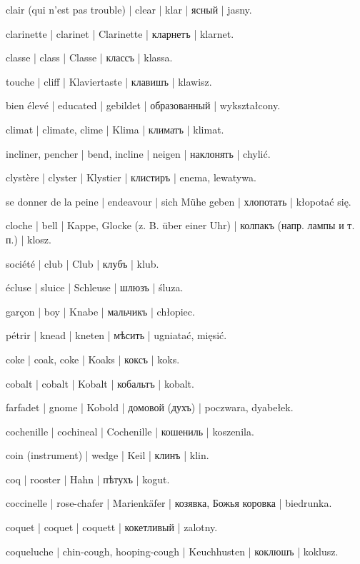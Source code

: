 \begin{outdent}{1em}
clair (qui n’est pas trouble) | clear | klar | ясный | jasny.

clarinette | clarinet | Clarinette | кларнетъ | klarnet.

classe | class | Classe | классъ | klassa.

touche | cliff | Klaviertaste | клавишъ | klawisz.

bien élevé | educated | gebildet | образованный | wykształcony.

climat | climate, clime | Klima | климатъ | klimat.

incliner, pencher | bend, incline | neigen | наклонять | chylić.

clystère | clyster | Klystier | клистиръ | enema, lewatywa.

se donner de la peine | endeavour | sich Mühe geben | хлопотать | kłopotać się.

cloche | bell | Kappe, Glocke (z. B. über einer Uhr) | колпакъ
(напр. лампы и т. п.) | klosz.

société | club | Club | клубъ | klub.

écluse | sluice | Schleuse | шлюзъ | śluza.

garçon | boy | Knabe | мальчикъ | chłopiec.

pétrir | knead | kneten | мѣсить | ugniatać, mięsić.

coke | coak, coke | Koaks | коксъ | koks.

cobalt | cobalt | Kobalt | кобальтъ | kobalt.

farfadet | gnome | Kobold | домовой (духъ) | poczwara, dyabełek.

cochenille | cochineal | Cochenille | кошениль | koszenila.

coin (instrument) | wedge | Keil | клинъ | klin.

coq | rooster | Hahn | пѣтухъ | kogut.

coccinelle | rose-chafer | Marienkäfer | козявка, Божья
коровка | biedrunka.

coquet | coquet | coquett | кокетливый | zalotny.

coqueluche | chin-cough, hooping-cough | Keuchhusten | коклюшъ | koklusz.


\end{outdent}
